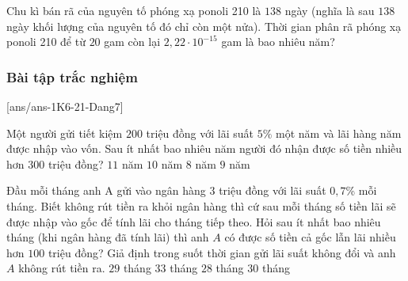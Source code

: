 \begin{bt}%
	Chu kì bán rã của nguyên tố phóng xạ ponoli 210 là $138$ ngày (nghĩa là sau $138$ ngày khối lượng của nguyên tố đó chỉ còn một nửa). Thời gian phân rã phóng xạ ponoli 210 để từ $20$ gam còn lại $2{,}22 \cdot 10^{-15}$ gam là bao nhiêu năm?
	
\end{bt}
\subsubsection{Bài tập trắc nghiệm}
[ans/ans-1K6-21-Dang7]
\begin{ex}%
	Một người gửi tiết kiệm $200$ triệu đồng với lãi suất $5\%$ một năm và lãi hàng năm được nhập vào vốn. Sau ít nhất bao nhiêu năm người đó nhận được số tiền nhiều hơn $300$ triệu đồng?
	\choice
	{$11$ năm}
	{$10$ năm}
	{$8$ năm}
	{\True $9$ năm}
	
\end{ex}

\begin{ex}%
	Đầu mỗi tháng anh A gửi vào ngân hàng $3$ triệu đồng với lãi suất $0{,}7$\% mỗi tháng. Biết không rút tiền ra khỏi ngân hàng thì cứ sau mỗi tháng số tiền lãi sẽ được nhập vào gốc để tính lãi cho tháng tiếp theo. Hỏi sau ít nhất bao nhiêu tháng (khi ngân hàng đã tính lãi) thì anh $A$ có được số tiền cả gốc lẫn lãi nhiều hơn $100$ triệu đồng? Giả định trong suốt thời gian gửi lãi suất không đổi và anh $A$ không rút tiền ra.
	\choice
	{$29$ tháng}
	{$33$ tháng}
	{$28$ tháng}
	{\True $30$ tháng}
	
\end{ex}

